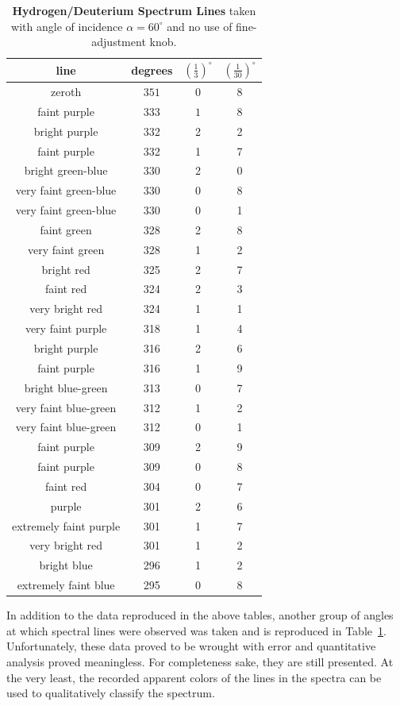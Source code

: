 \documentclass[paper=a4, fontsize=11pt]{scrartcl} %
\numberwithin{equation}{section}
\numberwithin{figure}{section}
\numberwithin{table}{section}
\begin{document}
\begin{table}[H]
\centering
\caption{\textbf{Hydrogen/Deuterium Spectrum Lines} taken with angle of incidence $\alpha = 60^\circ$ and no use of fine-adjustment knob. }
\begin{tabular}{ || c | c c c || }
  \hline
  \hline
  line & degrees & $(\frac{1}{3})^\circ$ & $(\frac{1}{30})^\circ$  \\
  \hline
  zeroth & $351$ & $0$ & $8$  \\
  faint purple & 333 & $1$ & $8$  \\
  bright purple & 332 & 2 & 2 \\
  faint purple & 332 & 1 & 7 \\
  bright green-blue & 330 & 2 & 0 \\
  very faint green-blue & 330 & 0 & 8 \\
  very faint green-blue & 330 & 0 & 1 \\
  faint green & 328 & 2 & 8 \\
  very faint green & 328 & 1 & 2 \\
  bright red & 325 & 2 & 7 \\
  faint red & 324 & 2 & 3 \\
  very bright red & 324 & 1 & 1 \\
  very faint purple & 318 & 1 & 4 \\
  bright purple & 316 & 2 & 6 \\
  faint purple & 316 & 1 & 9 \\
  bright blue-green & 313 & 0 & 7 \\
  very faint blue-green & 312 & 1 & 2 \\
  very faint blue-green & 312 & 0 & 1 \\
  faint purple & 309 & 2 & 9 \\
  faint purple & 309 & 0 & 8 \\
  faint red & 304 & 0 & 7 \\
  purple & 301 & 2 & 6 \\
  extremely faint purple & 301 & 1 & 7 \\
  very bright red & 301 & 1 & 2 \\
  bright blue & 296 & 1 & 2 \\
  extremely faint blue & 295 & 0 & 8 \\
  \hline
  \hline
\end{tabular}
\label{table:hd60}
\end{table}


In addition to the data reproduced in the above tables, another group of angles at which spectral lines were observed was taken and is reproduced in Table~\ref{table:hd60}. Unfortunately, these data proved to be wrought with error and quantitative analysis proved meaningless. For completeness sake, they are still presented. At the very least, the recorded apparent colors of the lines in the spectra can be used to qualitatively classify the spectrum.
\end{document}
